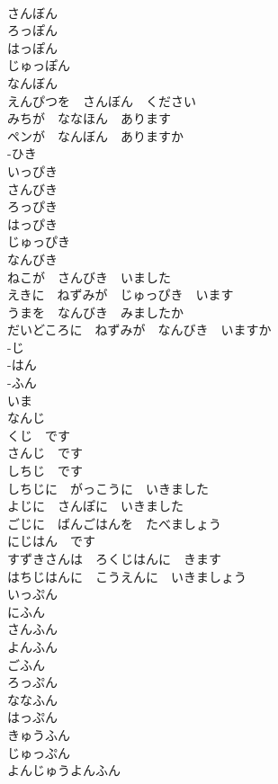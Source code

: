 \documentclass[8pt]{extreport}
\begin{document}
\begin{CJK}{UTF8}{min}
\\	さんぼん	
\\	ろっぽん	
\\	はっぽん	
\\	じゅっぽん	
\\	なんぼん	
\\	えんぴつを　さんぼん　ください	
\\	みちが　ななほん　あります	
\\	ペンが　なんぼん　ありますか	
\\	-ひき	
\\	いっぴき	
\\	さんびき	
\\	ろっぴき	
\\	はっぴき	
\\	じゅっぴき	
\\	なんびき	
\\	ねこが　さんびき　いました	
\\	えきに　ねずみが　じゅっぴき　います	
\\	うまを　なんびき　みましたか	
\\	だいどころに　ねずみが　なんびき　いますか	
\\	-じ	
\\	-はん	
\\	-ふん	
\\	いま	
\\	なんじ	
\\	くじ　です	
\\	さんじ　です	
\\	しちじ　です	
\\	しちじに　がっこうに　いきました	
\\	よじに　さんぽに　いきました	
\\	ごじに　ばんごはんを　たべましょう	
\\	にじはん　です	
\\	すずきさんは　ろくじはんに　きます	
\\	はちじはんに　こうえんに　いきましょう	
\\	いっぷん	
\\	にふん	
\\	さんふん	
\\	よんふん	
\\	ごふん	
\\	ろっぷん	
\\	ななふん	
\\	はっぷん	
\\	きゅうふん	
\\	じゅっぷん	
\\	よんじゅうよんふん	

\end{CJK}
\end{document}
